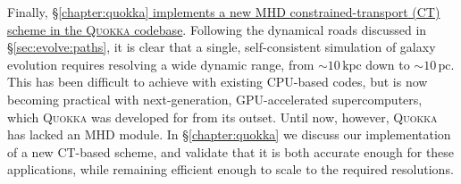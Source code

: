 Finally, \uline{\S\ref{chapter:quokka} implements a new MHD constrained-transport (CT) scheme in the \textsc{Quokka} codebase}. Following the dynamical roads discussed in \S\ref{sec:evolve:paths}, it is clear that a single, self-consistent simulation of galaxy evolution requires resolving a wide dynamic range, from $\sim 10 \,\mathrm{kpc}$ down to $\sim 10 \,\mathrm{pc}$. This has been difficult to achieve with existing CPU-based codes, but is now becoming practical with next-generation, GPU-accelerated supercomputers, which \textsc{Quokka} was developed for from its outset. Until now, however, \textsc{Quokka} has lacked an MHD module. In \S\ref{chapter:quokka} we discuss our implementation of a new CT-based scheme, and validate that it  is both accurate enough for these applications, while remaining efficient enough to scale to the required resolutions.
